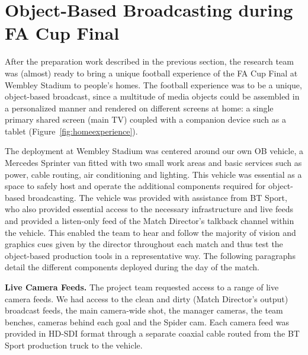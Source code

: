\documentclass[sigchi-a, authorversion]{acmart}
\begin{document}
\section{Object-Based Broadcasting during FA Cup Final}
After the preparation work described in the previous section, the research team
was (almost) ready to bring a unique football experience of the FA Cup Final
at Wembley Stadium to people's homes. The football experience was to be a unique, object-based broadcast, since a
multitude of media objects could be assembled in a personalized manner and rendered on
different screens at home: a single primary shared screen (main TV) coupled with
a companion device such as a tablet (Figure~\ref{fig:homeexperience}).

The deployment at Wembley Stadium was centered around our own OB vehicle, a
Mercedes Sprinter van fitted with two small work areas and basic services
such as power, cable routing, air conditioning and lighting. This vehicle was
essential as a space to safely host and operate the additional components
required for object-based broadcasting. The vehicle was provided with assistance
from BT Sport, who also provided essential access to the necessary infrastructure
and live feeds and provided a listen-only feed of the Match Director's talkback
channel within the vehicle. This enabled the team to hear and follow the
majority of vision and graphics cues given by the director throughout each
match and thus test the object-based production tools in a representative way.
The following paragraphs detail the different components deployed during the day
of the match.

\vspace{5pt}\noindent\textbf{Live Camera Feeds.} The project team requested
access to a range of live camera feeds. We had access to the clean and dirty
(Match Director's output) broadcast feeds, the main camera-wide shot, the
manager cameras, the team benches, cameras behind each goal and the Spider
cam. Each camera feed was provided in HD-SDI format through a separate coaxial cable
routed from the BT Sport production truck to the vehicle.
\end{document}
